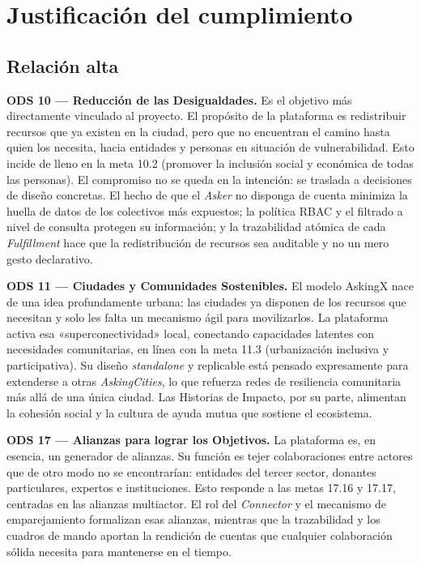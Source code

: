 \documentclass[11pt,oneside,spanish,listoffigures,listoftables]{tfgetsinf}
\begin{document}
\section{Justificación del cumplimiento}

\subsection{Relación alta}

\textbf{ODS 10 — Reducción de las Desigualdades.} Es el objetivo más directamente vinculado al proyecto. El propósito de la plataforma es redistribuir recursos que ya existen en la ciudad, pero que no encuentran el camino hasta quien los necesita, hacia entidades y personas en situación de vulnerabilidad. Esto incide de lleno en la meta 10.2 (promover la inclusión social y económica de todas las personas). El compromiso no se queda en la intención: se traslada a decisiones de diseño concretas. El hecho de que el \textit{Asker} no disponga de cuenta minimiza la huella de datos de los colectivos más expuestos; la política RBAC y el filtrado a nivel de consulta protegen su información; y la trazabilidad atómica de cada \textit{Fulfillment} hace que la redistribución de recursos sea auditable y no un mero gesto declarativo.

\textbf{ODS 11 — Ciudades y Comunidades Sostenibles.} El modelo AskingX nace de una idea profundamente urbana: las ciudades ya disponen de los recursos que necesitan y solo les falta un mecanismo ágil para movilizarlos. La plataforma activa esa «superconectividad» local, conectando capacidades latentes con necesidades comunitarias, en línea con la meta 11.3 (urbanización inclusiva y participativa). Su diseño \textit{standalone} y replicable está pensado expresamente para extenderse a otras \textit{AskingCities}, lo que refuerza redes de resiliencia comunitaria más allá de una única ciudad. Las Historias de Impacto, por su parte, alimentan la cohesión social y la cultura de ayuda mutua que sostiene el ecosistema.

\textbf{ODS 17 — Alianzas para lograr los Objetivos.} La plataforma es, en esencia, un generador de alianzas. Su función es tejer colaboraciones entre actores que de otro modo no se encontrarían: entidades del tercer sector, donantes particulares, expertos e instituciones. Esto responde a las metas 17.16 y 17.17, centradas en las alianzas multiactor. El rol del \textit{Connector} y el mecanismo de emparejamiento formalizan esas alianzas, mientras que la trazabilidad y los cuadros de mando aportan la rendición de cuentas que cualquier colaboración sólida necesita para mantenerse en el tiempo.
\end{document}
